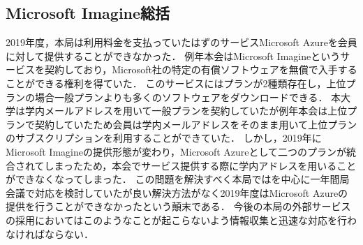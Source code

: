 \subsection*{Microsoft Imagine総括}

2019年度，本局は利用料金を支払っていたはずのサービスMicrosoft Azureを会員に対して提供することができなかった．
例年本会はMicrosoft Imagineというサービスを契約しており，Microsoft社の特定の有償ソフトウェアを無償で入手することができる権利を得ていた．
このサービスにはプランが2種類存在し，上位プランの場合一般プランよりも多くのソフトウェアをダウンロードできる．
本大学は学内メールアドレスを用いて一般プランを契約していたが例年本会は上位プランで契約していたため会員は学内メールアドレスをそのまま用いて上位プランのサブスクリプションを利用することができていた．
しかし，2019年にMicrosoft Imagineの提供形態が変わり，Microsoft Azureとして二つのプランが統合されてしまったため，本会でサービス提供する際に学内アドレスを用いることができなくなってしまった．
この問題を解決すべく本局では\thirdGrade{}を中心に一年間局会議で対応を検討していたが良い解決方法がなく2019年度はMicrosoft Azureの提供を行うことができなかったという顛末である．
今後の本局の外部サービスの採用においてはこのようなことが起こらないよう情報収集と迅速な対応を行わなければならない．
